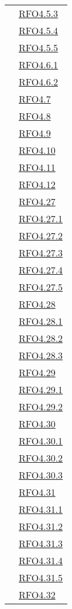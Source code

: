 \begin{longtable}{|>{\centering}m{5cm}|m{5cm}<{\centering}|}
& \hyperlink{RFO4.5.3}{RFO4.5.3}\\
& \hyperlink{RFO4.5.4}{RFO4.5.4}\\
& \hyperlink{RFO4.5.5}{RFO4.5.5}\\
& \hyperlink{RFO4.6.1}{RFO4.6.1}\\
& \hyperlink{RFO4.6.2}{RFO4.6.2}\\
& \hyperlink{RFO4.7}{RFO4.7}\\
& \hyperlink{RFO4.8}{RFO4.8}\\
& \hyperlink{RFO4.9}{RFO4.9}\\
& \hyperlink{RFO4.10}{RFO4.10}\\
& \hyperlink{RFO4.11}{RFO4.11}\\
& \hyperlink{RFO4.12}{RFO4.12}\\
& \hyperlink{RFO4.27}{RFO4.27}\\
& \hyperlink{RFO4.27.1}{RFO4.27.1}\\
& \hyperlink{RFO4.27.2}{RFO4.27.2}\\
& \hyperlink{RFO4.27.3}{RFO4.27.3}\\
& \hyperlink{RFO4.27.4}{RFO4.27.4}\\
& \hyperlink{RFO4.27.5}{RFO4.27.5}\\%
& \hyperlink{RFO4.28}{RFO4.28}\\
& \hyperlink{RFO4.28.1}{RFO4.28.1}\\
& \hyperlink{RFO4.28.2}{RFO4.28.2}\\
& \hyperlink{RFO4.28.3}{RFO4.28.3}\\
& \hyperlink{RFO4.29}{RFO4.29}\\
& \hyperlink{RFO4.29.1}{RFO4.29.1}\\
& \hyperlink{RFO4.29.2}{RFO4.29.2}\\
& \hyperlink{RFO4.30}{RFO4.30}\\
& \hyperlink{RFO4.30.1}{RFO4.30.1}\\
& \hyperlink{RFO4.30.2}{RFO4.30.2}\\
& \hyperlink{RFO4.30.3}{RFO4.30.3}\\
& \hyperlink{RFO4.31}{RFO4.31}\\
& \hyperlink{RFO4.31.1}{RFO4.31.1}\\
& \hyperlink{RFO4.31.2}{RFO4.31.2}\\
& \hyperlink{RFO4.31.3}{RFO4.31.3}\\
& \hyperlink{RFO4.31.4}{RFO4.31.4}\\
& \hyperlink{RFO4.31.5}{RFO4.31.5}\\
& \hyperlink{RFO4.32}{RFO4.32}\\

\end{longtable}
